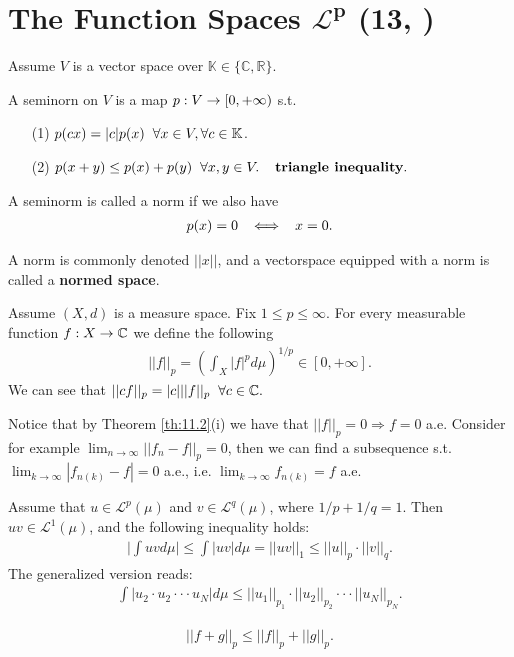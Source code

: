 \section{The Function Spaces \(\boldsymbol{\mathcal{L}^p}\) \tiny{(13, \cite{schilling2017measures})}}
Assume $V$ is a vector space over $\mathbb K\in\{\mathbb C,\mathbb R\}$.

\begin{definition}
    A seminorn on $V$ is a map $p:V\rightarrow [0,+\infty)$ s.t. 
    \begin{itemize}
        \item[(1)] $p(cx)=|c|p(x)\hspace{2mm} \forall x\in V,\forall c\in \mathbb K$.
        \item[(2)] $p(x+y)\leq p(x) +p(y)\hspace{2mm} \forall x,y\in V. \hspace{4mm} \textbf{triangle inequality}. $
    \end{itemize}
    A seminorm is called a norm if we also have \begin{align*}
        p(x)=0\hspace{2mm} \iff \hspace{2mm} x=0.
    \end{align*}
\end{definition}

A norm is commonly denoted $||x||$, and a vectorspace equipped with a norm is called a \textbf{normed space}.


\begin{definition}
    Assume $(X,d)$ is a measure space. Fix $1\leq p\leq \infty.$ For every measurable function $f:X\rightarrow \mathbb{C}$ we define the following
    \begin{align}
        ||f||_p = \left( \int_X |f|^p d\mu\right)^{1/p}\in [0,+\infty].
    \end{align} 
    We can see that $||cf||_p=|c|||f||_p\hspace{2mm} \forall c\in\mathbb{C}.$ 
    
    Notice that by Theorem \ref{th:11.2}(i) we have that \(||f||_p=0\Rightarrow 
    f=0\) a.e. Consider for example \(\lim_{n\rightarrow\infty}||f_n-f||_p=0\), then we can find a subsequence s.t. 
    \(\lim_{k\rightarrow\infty}|f_{n(k)}-f|=0\) a.e., i.e.
    \(\lim_{k\rightarrow\infty}f_{n(k)} = f\) a.e. 
\end{definition}

\begin{theorem}
    Assume that \(u\in\mathcal{L}^p(\mu)\) and \(v\in\mathcal{L}^q(\mu)\), where \(1/p+1/q=1\). Then \(uv\in\mathcal{L}^1(\mu)\), and the following inequality holds:
    \begin{align*}
        \Big\vert \int uv d\mu \Big\vert \leq \int |uv| d\mu=||uv||_1 \leq||u||_p\cdot ||v||_q.
    \end{align*}
    The generalized version reads:
    \begin{align*}
        \int |u_2 \cdot u_2 \cdot \cdot \cdot u_N |d\mu \leq ||u_1||_{p_1}\cdot ||u_2||_{p_2} \cdot\cdot\cdot ||u_N||_{p_N}.
    \end{align*}
    
\end{theorem}
\begin{lemma}
    \begin{align}
        ||f+g||_p\leq ||f||_p+||g||_p.
    \end{align}
\end{lemma}

